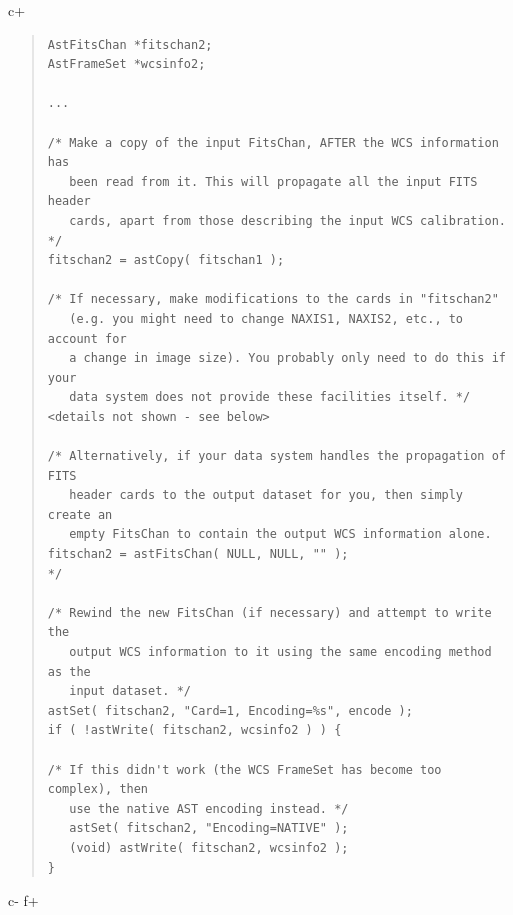 \documentclass[twoside,11pt]{article}
\begin{document}
c+
\begin{quote}
\small
\begin{verbatim}
AstFitsChan *fitschan2;
AstFrameSet *wcsinfo2;

...

/* Make a copy of the input FitsChan, AFTER the WCS information has
   been read from it. This will propagate all the input FITS header
   cards, apart from those describing the input WCS calibration. */
fitschan2 = astCopy( fitschan1 );

/* If necessary, make modifications to the cards in "fitschan2"
   (e.g. you might need to change NAXIS1, NAXIS2, etc., to account for
   a change in image size). You probably only need to do this if your
   data system does not provide these facilities itself. */
<details not shown - see below>

/* Alternatively, if your data system handles the propagation of FITS
   header cards to the output dataset for you, then simply create an
   empty FitsChan to contain the output WCS information alone.
fitschan2 = astFitsChan( NULL, NULL, "" );
*/

/* Rewind the new FitsChan (if necessary) and attempt to write the
   output WCS information to it using the same encoding method as the
   input dataset. */
astSet( fitschan2, "Card=1, Encoding=%s", encode );
if ( !astWrite( fitschan2, wcsinfo2 ) ) {

/* If this didn't work (the WCS FrameSet has become too complex), then
   use the native AST encoding instead. */
   astSet( fitschan2, "Encoding=NATIVE" );
   (void) astWrite( fitschan2, wcsinfo2 );
}
\end{verbatim}
\normalsize
\end{quote}
c-
f+
\small
\end{document}

